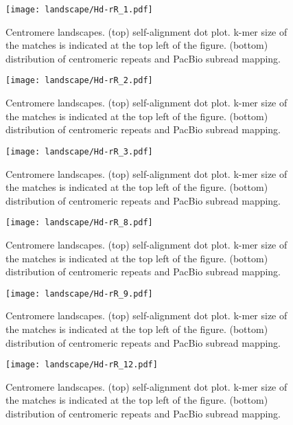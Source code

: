 \begin{figure}[p]
  \centering
  \texttt{[image: landscape/Hd-rR\_1.pdf]}
  \caption{
    Centromere landscapes. (top) self-alignment dot plot. k-mer size of the matches is indicated at the top left of the figure. (bottom) distribution of centromeric repeats and PacBio subread mapping.
  }
  \label{centromere_landscape}
\end{figure}

\addtocounter{figure}{-1}
\begin{figure}[p]
  \centering
  \texttt{[image: landscape/Hd-rR\_2.pdf]}
  \caption{
    Centromere landscapes. (top) self-alignment dot plot. k-mer size of the matches is indicated at the top left of the figure. (bottom) distribution of centromeric repeats and PacBio subread mapping.
  }
  \label{centromere_landscape}
\end{figure}

\addtocounter{figure}{-1}
\begin{figure}[p]
  \centering
  \texttt{[image: landscape/Hd-rR\_3.pdf]}
  \caption{
    Centromere landscapes. (top) self-alignment dot plot. k-mer size of the matches is indicated at the top left of the figure. (bottom) distribution of centromeric repeats and PacBio subread mapping.
  }
  \label{centromere_landscape}
\end{figure}

\addtocounter{figure}{-1}
\begin{figure}[p]
  \centering
  \texttt{[image: landscape/Hd-rR\_8.pdf]}
  \caption{
    Centromere landscapes. (top) self-alignment dot plot. k-mer size of the matches is indicated at the top left of the figure. (bottom) distribution of centromeric repeats and PacBio subread mapping.
  }
  \label{centromere_landscape}
\end{figure}

\addtocounter{figure}{-1}
\begin{figure}[p]
  \centering
  \texttt{[image: landscape/Hd-rR\_9.pdf]}
  \caption{
    Centromere landscapes. (top) self-alignment dot plot. k-mer size of the matches is indicated at the top left of the figure. (bottom) distribution of centromeric repeats and PacBio subread mapping.
  }
  \label{centromere_landscape}
\end{figure}

\addtocounter{figure}{-1}
\begin{figure}[p]
  \centering
  \texttt{[image: landscape/Hd-rR\_12.pdf]}
  \caption{
    Centromere landscapes. (top) self-alignment dot plot. k-mer size of the matches is indicated at the top left of the figure. (bottom) distribution of centromeric repeats and PacBio subread mapping.
  }
  \label{centromere_landscape}
\end{figure}

